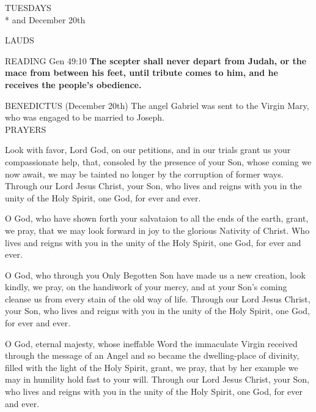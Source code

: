 \begin{center}\normalsize{\uppercase{Tuesdays}\\*}
\footnotesize{and December 20th}\end{center}
\begin{flushleft}\normalsize{\uppercase{Lauds\\}}\end{flushleft}
\noindent\small{\uppercase{Reading}} Gen 49:10 \textbf{ The scepter shall never depart from Judah, or the mace from between his feet, until tribute comes to him, and he receives the people’s obedience.\\}

\noindent\small{\uppercase{Benedictus}} (December 20th)
The angel Gabriel was sent to the Virgin Mary, who was engaged to be married to Joseph.\\

\noindent\small{\uppercase{Prayers}}\begin{description}[labelindent=\parindent, leftmargin=*]
\item [Week 1] Look with favor, Lord God, on our petitions, and in our trials grant us your compassionate help, that, consoled by the presence of your Son, whose coming we now await, we may be tainted no longer by the corruption of former ways. Through our Lord Jesus Christ, your Son, who lives and reigns with you in the unity of the Holy Spirit, one God, for ever and ever.
\item [Week 2] O God, who have shown forth your salvataion to all the ends of the earth, grant, we pray, that we may look forward in joy to the glorious Nativity of Christ. Who lives and reigns with you in the unity of the Holy Spirit, one God, for ever and ever.
\item [Week 3] O God, who through you Only Begotten Son have made us a new creation, look kindly, we pray, on the handiwork of your mercy, and at your Son's coming cleanse us from every stain of the old way of life. Through our Lord Jesus Christ, your Son, who lives and reigns with you in the unity of the Holy Spirit, one God, for ever and ever.
\item [December 20th] O God, eternal majesty, whose ineffable Word the immaculate Virgin received through the message of an Angel and so became the dwelling-place of divinity, filled with the light of the Holy Spirit, grant, we pray, that by her example we may in humility hold fast to your will. Through our Lord Jesus Christ, your Son, who lives and reigns with you in the unity of the Holy Spirit, one God, for ever and ever.
\end{description}

